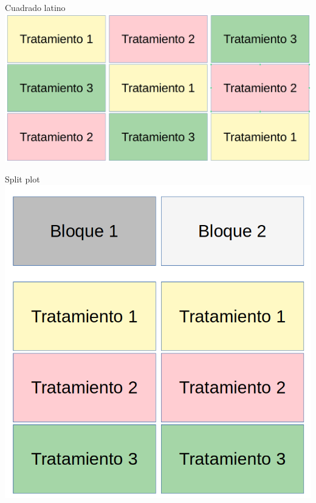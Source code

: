 \documentclass[
  11pt,
  ignorenonframetext,
]{beamer}
\begin{document}
\begin{frame}{Cuadrado latino}
\protect\hypertarget{cuadrado-latino}{}
\includegraphics{Figuras-disenos/Cuadrado-latino.png}
\end{frame}

\begin{frame}{Split plot}
\protect\hypertarget{split-plot}{}
\includegraphics{Figuras-disenos/Split-plot.png}
\end{frame}
\end{document}
